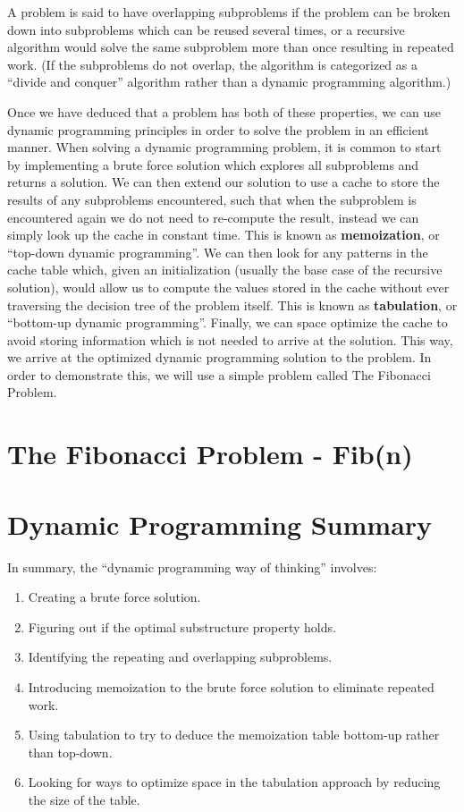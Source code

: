 \begin{definition}
    A problem is said to have overlapping subproblems if the problem can be broken down into subproblems which can be reused several times, or a recursive algorithm would solve the same subproblem more than once resulting in repeated work. (If the subproblems do not overlap, the algorithm is categorized as a ``divide and conquer'' algorithm rather than a dynamic programming algorithm.)
\end{definition} 
Once we have deduced that a problem has both of these properties, we can use dynamic programming principles in order to solve the problem in an efficient manner.
When solving a dynamic programming problem, it is common to start by implementing a brute force solution which explores all subproblems and returns a solution.
We can then extend our solution to use a cache to store the results of any subproblems encountered, such that when the subproblem is encountered again we do not need to re-compute the result, instead we can simply look up the cache in constant time.
This is known as \textbf{memoization}, or ``top-down dynamic programming''.
We can then look for any patterns in the cache table which, given an initialization (usually the base case of the recursive solution), would allow us to compute the values stored in the cache without ever traversing the decision tree of the problem itself.
This is known as \textbf{tabulation}, or ``bottom-up dynamic programming''.
Finally, we can space optimize the cache to avoid storing information which is not needed to arrive at the solution.
This way, we arrive at the optimized dynamic programming solution to the problem.
In order to demonstrate this, we will use a simple problem called The Fibonacci Problem.

\section{The Fibonacci Problem - Fib(n)}


\section{Dynamic Programming Summary}

In summary, the ``dynamic programming way of thinking'' involves:
\begin{enumerate}
    \item Creating a brute force solution.
    \item Figuring out if the optimal substructure property holds.
    \item Identifying the repeating and overlapping subproblems.
    \item Introducing memoization to the brute force solution to eliminate repeated work.
    \item Using tabulation to try to deduce the memoization table bottom-up rather than top-down.
    \item Looking for ways to optimize space in the tabulation approach by reducing the size of the table.
\end{enumerate}

